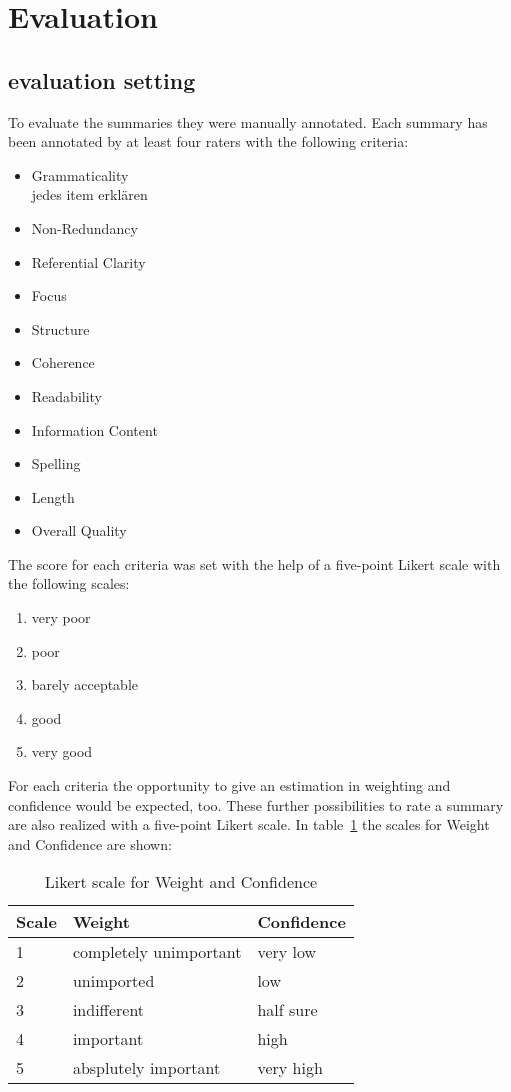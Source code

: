 
\section{Evaluation}
\label{ch:evaluation}

\subsection{evaluation setting}
To evaluate the summaries they were manually annotated.
Each summary has been annotated by at least four raters with the following criteria:
\begin{itemize}
	\item Grammaticality \\ jedes item erklären
	\item Non-Redundancy
	\item Referential Clarity
	\item Focus
	\item Structure
	\item Coherence
	\item Readability
	\item Information Content
	\item Spelling
	\item Length
	\item Overall Quality
\end{itemize}

The score for each criteria was set with the help of a five-point Likert scale with the following scales:

\begin{enumerate}
	\item very poor
	\item poor
	\item barely acceptable
	\item good
	\item very good
\end{enumerate}

For each criteria the opportunity to give an estimation in weighting and confidence would be expected, too.
These further possibilities to rate a summary are also realized with a five-point Likert scale.
In table~\ref{tab:evalikert} the scales for Weight and Confidence are shown:

\begin{table}[H]
	\begin{tabular}{l|ll} \toprule
		Scale & Weight & Confidence \\ \midrule
		1 & completely unimportant & very low \\
		2 & unimported & low \\
		3 & indifferent & half sure \\
		4 & important & high \\
		5 & absplutely important & very high \\ \bottomrule    
	\end{tabular}
	\caption{Likert scale for Weight and Confidence}
	\label{tab:evalikert}
\end{table}

